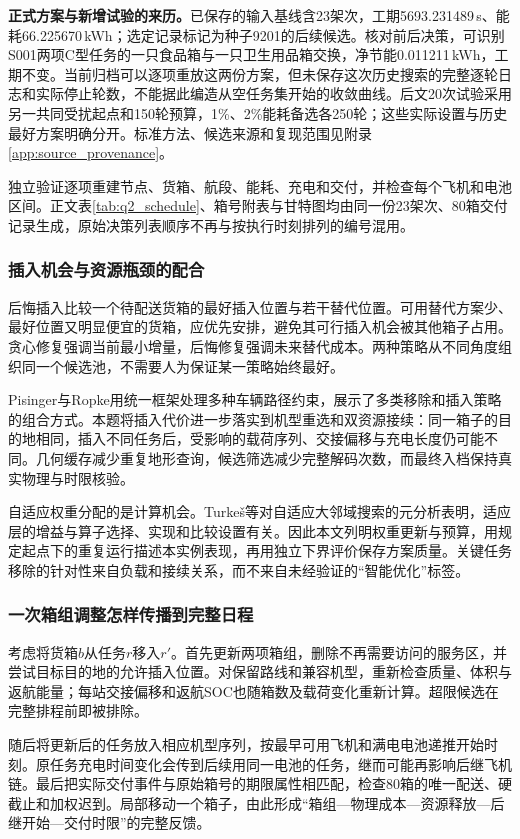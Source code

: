 \documentclass[withoutpreface,colorprint]{format}
\numberwithin{equation}{section}
\numberwithin{figure}{section}
\numberwithin{table}{section}
\begin{document}
\textbf{正式方案与新增试验的来历。}已保存的输入基线含23架次，工期5693.231489\,s、能耗66.225670\,kWh；选定记录标记为种子9201的后续候选。核对前后决策，可识别S001两项C型任务的一只食品箱与一只卫生用品箱交换，净节能0.011211\,kWh，工期不变。当前归档可以逐项重放这两份方案，但未保存这次历史搜索的完整逐轮日志和实际停止轮数，不能据此编造从空任务集开始的收敛曲线。后文20次试验采用另一共同受扰起点和150轮预算，1\%、2\%能耗备选各250轮；这些实际设置与历史最好方案明确分开。标准方法、候选来源和复现范围见附录\ref{app:source_provenance}。

独立验证逐项重建节点、货箱、航段、能耗、充电和交付，并检查每个飞机和电池区间。正文表\ref{tab:q2_schedule}、箱号附表与甘特图均由同一份23架次、80箱交付记录生成，原始决策列表顺序不再与按执行时刻排列的编号混用。



\subsubsection{插入机会与资源瓶颈的配合}
后悔插入比较一个待配送货箱的最好插入位置与若干替代位置。可用替代方案少、最好位置又明显便宜的货箱，应优先安排，避免其可行插入机会被其他箱子占用。贪心修复强调当前最小增量，后悔修复强调未来替代成本。两种策略从不同角度组织同一个候选池，不需要人为保证某一策略始终最好。

Pisinger与Ropke用统一框架处理多种车辆路径约束，展示了多类移除和插入策略的组合方式\cite{pisinger2007}。本题将插入代价进一步落实到机型重选和双资源接续：同一箱子的目的地相同，插入不同任务后，受影响的载荷序列、交接偏移与充电长度仍可能不同。几何缓存减少重复地形查询，候选筛选减少完整解码次数，而最终入档保持真实物理与时限核验。

自适应权重分配的是计算机会。Turkeš等对自适应大邻域搜索的元分析表明，适应层的增益与算子选择、实现和比较设置有关\cite{turkes2021}。因此本文列明权重更新与预算，用规定起点下的重复运行描述本实例表现，再用独立下界评价保存方案质量。关键任务移除的针对性来自负载和接续关系，而不来自未经验证的“智能优化”标签。

\subsubsection{一次箱组调整怎样传播到完整日程}
考虑将货箱$b$从任务$r$移入$r'$。首先更新两项箱组，删除不再需要访问的服务区，并尝试目标目的地的允许插入位置。对保留路线和兼容机型，重新检查质量、体积与返航能量；每站交接偏移和返航SOC也随箱数及载荷变化重新计算。超限候选在完整排程前即被排除。

随后将更新后的任务放入相应机型序列，按最早可用飞机和满电电池递推开始时刻。原任务充电时间变化会传到后续用同一电池的任务，继而可能再影响后继飞机链。最后把实际交付事件与原始箱号的期限属性相匹配，检查80箱的唯一配送、硬截止和加权迟到。局部移动一个箱子，由此形成“箱组—物理成本—资源释放—后继开始—交付时限”的完整反馈。
\end{document}
